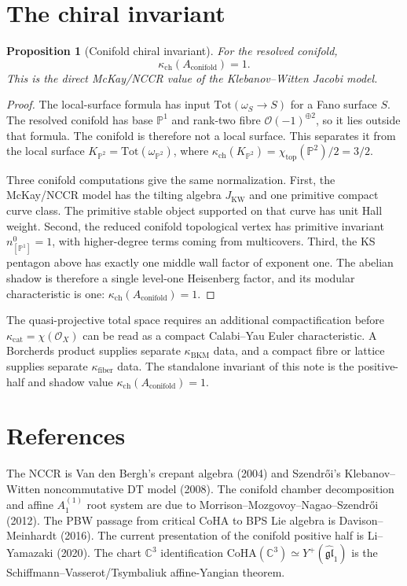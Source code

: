 \documentclass[11pt]{amsart}
\providecommand{\C}{\mathbb{C}}
\providecommand{\bP}{\mathbb{P}}
\providecommand{\cO}{\mathcal{O}}
\providecommand{\fgl}{\mathfrak{gl}}
\providecommand{\CoHA}{\mathrm{CoHA}}
\providecommand{\Tot}{\mathrm{Tot}}
\providecommand{\kch}{\kappa_{\mathrm{ch}}}
\providecommand{\kcat}{\kappa_{\mathrm{cat}}}
\providecommand{\kfib}{\kappa_{\mathrm{fiber}}}
\theoremstyle{plain}
\newtheorem{proposition}[theorem]{Proposition}
\theoremstyle{definition}
\theoremstyle{remark}
\begin{document}
\section{The chiral invariant}

\begin{proposition}[Conifold chiral invariant]
For the resolved conifold,
\[
  \kch(A_{\mathrm{conifold}})=1.
\]
This is the direct McKay/NCCR value of the Klebanov--Witten Jacobi
model.
\end{proposition}

\begin{proof}
The local-surface formula has input $\Tot(\omega_S\to S)$ for a Fano
surface $S$.  The resolved conifold has base $\bP^1$ and rank-two
fibre $\cO(-1)^{\oplus2}$, so it lies outside that formula.  The
conifold is therefore not a local surface.  This separates it from
the local surface
$K_{\bP^2}=\Tot(\omega_{\bP^2})$, where
\(\kappa_{\mathrm{ch}}(K_{\bP^2})
=\chi_{\mathrm{top}}(\bP^2)/2=3/2\).

Three conifold computations give the same normalization.  First, the
McKay/NCCR model has the tilting algebra $J_{\mathrm{KW}}$ and one
primitive compact curve class.  The primitive stable object supported
on that curve has unit Hall weight.  Second, the reduced conifold
topological vertex has primitive invariant
\(n^0_{[\bP^1]}=1\), with higher-degree terms coming from multicovers.
Third, the KS pentagon above has exactly one middle wall factor of
exponent one.  The abelian shadow is therefore a single level-one
Heisenberg factor, and its modular characteristic is one:
\(\kch(A_{\mathrm{conifold}})=1\).
\end{proof}

The quasi-projective total space requires an additional compactification
before \(\kcat=\chi(\cO_X)\) can be read as a compact Calabi--Yau
Euler characteristic.  A Borcherds product supplies separate
\(\kappa_{\mathrm{BKM}}\) data, and a compact fibre or lattice supplies
separate \(\kfib\) data.  The standalone invariant of this note is the
positive-half and shadow value \(\kch(A_{\mathrm{conifold}})=1\).

\section{References}

The NCCR is Van den Bergh's crepant algebra
\textup{(}2004\textup{)} and Szendr\H{o}i's Klebanov--Witten
noncommutative DT model \textup{(}2008\textup{)}.  The conifold chamber
decomposition and affine \(A_1^{(1)}\) root system are due to
Morrison--Mozgovoy--Nagao--Szendr\H{o}i \textup{(}2012\textup{)}.  The
PBW passage from critical CoHA to BPS Lie algebra is
Davison--Meinhardt \textup{(}2016\textup{)}.  The current presentation
of the conifold positive half is Li--Yamazaki \textup{(}2020\textup{)}.
The chart
\(\C^3\) identification
\(\CoHA(\C^3)\simeq Y^+(\widehat{\fgl}_1)\) is the
Schiffmann--Vasserot/Tsymbaliuk affine-Yangian theorem.
\end{document}
